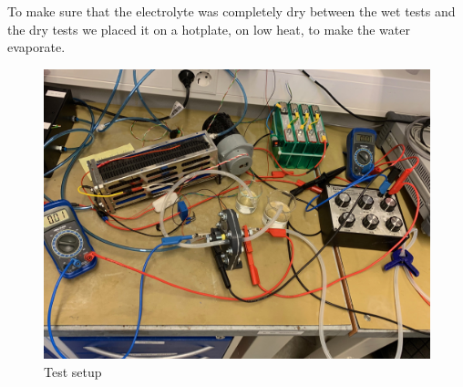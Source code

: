 To make sure that the electrolyte was completely dry between the wet tests and the dry tests we placed it on a hotplate, on low heat, to make the water evaporate.

\begin{figure}[ht]
    \centering
    \includegraphics[width=\textwidth]{DIV./Bilder/lab.jpg}
    \caption{Test setup}
    \label{fig:TestSetup}
\end{figure}

